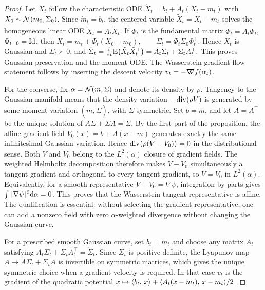 \begin{proof}
Let \(X_t\) follow the characteristic ODE \(\dot X_t=b_t+A_t(X_t-m_t)\) with \(X_0\sim\mathcal{N}(m_0,\Sigma_0)\). Since \(\dot m_t=b_t\), the centered variable \(\tilde X_t=X_t-m_t\) solves the homogeneous linear ODE \(\dot{\tilde X}_t=A_t\tilde X_t\). If \(\Phi_t\) is the fundamental matrix \(\dot\Phi_t=A_t\Phi_t\), \(\Phi_{t=0}=\mathrm{Id}\), then
\(X_t=m_t+\Phi_t(X_0-m_0), \qquad \Sigma_t=\Phi_t\Sigma_0\Phi_t^\top.\)
Hence \(X_t\) is Gaussian and \(\Sigma_t\succ0\), and
\(\dot\Sigma_t = \frac{\mathrm{d}}{\mathrm{d} t}\mathbb{E}\bigl(\tilde X_t\tilde X_t^\top\bigr) = A_t\Sigma_t+\Sigma_t A_t^\top.\)
This proves Gaussian preservation and the moment ODE\@. The Wasserstein gradient-flow statement follows by inserting the descent velocity $v_t=-\mathord{\nabla\mkern-9.3mu\nabla} f(\alpha_t)$.

For the converse, fix $\alpha=\mathcal{N}(m,\Sigma)$ and denote its density by $\rho$. Tangency to the Gaussian manifold means that the density variation $-\operatorname{div}(\rho V)$ is generated by some moment variation $(\dot m,\dot\Sigma)$, with $\dot\Sigma$ symmetric. Set $b=\dot m$, and let $A=A^\top$ be the unique solution of
\(A\Sigma+\Sigma A=\dot\Sigma\).
By the first part of the proposition, the affine gradient field $V_0(x)=b+A(x-m)$ generates exactly the same infinitesimal Gaussian variation. Hence
\(\operatorname{div}\bigl(\rho(V-V_0)\bigr)=0\)
in the distributional sense. Both $V$ and $V_0$ belong to the $L^2(\alpha)$ closure of gradient fields. The weighted Helmholtz decomposition therefore makes $V-V_0$ simultaneously a tangent gradient and orthogonal to every tangent gradient, so $V=V_0$ in $L^2(\alpha)$. Equivalently, for a smooth representative $V-V_0=\nabla\psi$, integration by parts gives $\int|\!| \nabla\psi |\!|^2\mathrm{d}\alpha=0$. This proves that the Wasserstein tangent representative is affine. The qualification is essential: without selecting the gradient representative, one can add a nonzero field with zero $\alpha$-weighted divergence without changing the Gaussian curve.

For a prescribed smooth Gaussian curve, set $b_t=\dot m_t$ and choose any matrix $A_t$ satisfying $A_t\Sigma_t+\Sigma_tA_t^\top=\dot\Sigma_t$. Since $\Sigma_t$ is positive definite, the Lyapunov map $A\mapsto A\Sigma_t+\Sigma_t A$ is invertible on symmetric matrices, which gives the unique symmetric choice when a gradient velocity is required. In that case $v_t$ is the gradient of the quadratic potential $x\mapsto \langle b_t,\,x\rangle+\langle A_t(x-m_t),\,x-m_t\rangle/2$.
\end{proof}
